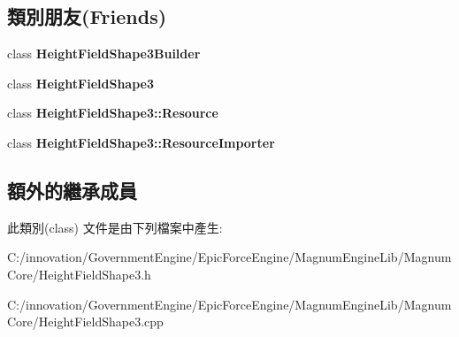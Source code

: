 \subsection*{類別朋友(Friends)}
\begin{DoxyCompactItemize}
\item 
class {\bfseries Height\+Field\+Shape3\+Builder}\hypertarget{class_i_dream_sky_1_1_height_field_shape3_1_1_resource_ad601eb47f5c3430dca8c88f9dd93b2da}{}\label{class_i_dream_sky_1_1_height_field_shape3_1_1_resource_ad601eb47f5c3430dca8c88f9dd93b2da}

\item 
class {\bfseries Height\+Field\+Shape3}\hypertarget{class_i_dream_sky_1_1_height_field_shape3_1_1_resource_ab808f8979681967b9d908bfe30f4841b}{}\label{class_i_dream_sky_1_1_height_field_shape3_1_1_resource_ab808f8979681967b9d908bfe30f4841b}

\item 
class {\bfseries Height\+Field\+Shape3\+::\+Resource}\hypertarget{class_i_dream_sky_1_1_height_field_shape3_1_1_resource_a489733af8b1e9cab1ee9700c1f619014}{}\label{class_i_dream_sky_1_1_height_field_shape3_1_1_resource_a489733af8b1e9cab1ee9700c1f619014}

\item 
class {\bfseries Height\+Field\+Shape3\+::\+Resource\+Importer}\hypertarget{class_i_dream_sky_1_1_height_field_shape3_1_1_resource_a42ac71e9d35461ef687afa596057b1a9}{}\label{class_i_dream_sky_1_1_height_field_shape3_1_1_resource_a42ac71e9d35461ef687afa596057b1a9}

\end{DoxyCompactItemize}
\subsection*{額外的繼承成員}


此類別(class) 文件是由下列檔案中產生\+:\begin{DoxyCompactItemize}
\item 
C\+:/innovation/\+Government\+Engine/\+Epic\+Force\+Engine/\+Magnum\+Engine\+Lib/\+Magnum\+Core/Height\+Field\+Shape3.\+h\item 
C\+:/innovation/\+Government\+Engine/\+Epic\+Force\+Engine/\+Magnum\+Engine\+Lib/\+Magnum\+Core/Height\+Field\+Shape3.\+cpp\end{DoxyCompactItemize}
